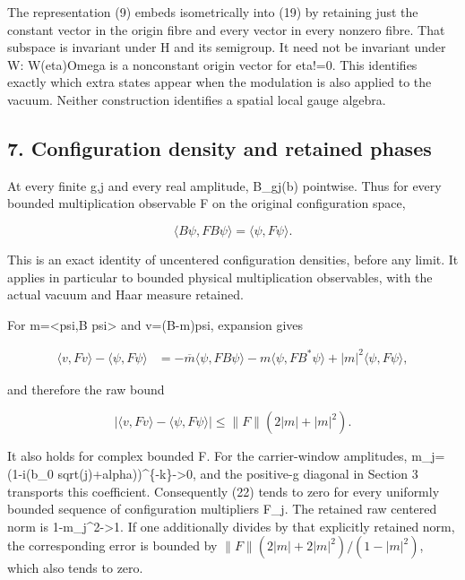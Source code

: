 \documentclass[
  11pt,
]{article}
\begin{document}
The representation (9) embeds isometrically into (19) by retaining just
the constant vector in the origin fibre and every vector in every
nonzero fibre. That subspace is invariant under H and its semigroup. It
need not be invariant under W: W(eta)Omega is a nonconstant origin
vector for eta!=0. This identifies exactly which extra states appear
when the modulation is also applied to the vacuum. Neither construction
identifies a spatial local gauge algebra.

\subsection{7. Configuration density and retained
phases}\label{weak-coupling-part-5-configuration-density-and-retained-phases}

At every finite g,j and every real amplitude,
\textbar B\_gj(b) pointwise. Thus for every bounded
multiplication observable F on the original configuration space,

\[
 \langle B\psi,F B\psi\rangle=\langle\psi,F\psi\rangle.
 \tag{21}
\]

This is an exact identity of uncentered configuration densities, before
any limit. It applies in particular to bounded physical multiplication
observables, with the actual vacuum and Haar measure retained.

For m=\textless psi,B psi\textgreater{} and v=(B-m)psi, expansion gives

\[
 \begin{split}
 \langle v,Fv\rangle-\langle\psi,F\psi\rangle
 &=-\overline m\langle\psi,FB\psi\rangle
   -m\langle\psi,FB^*\psi\rangle
   +|m|^2\langle\psi,F\psi\rangle,
 \end{split}
\]

and therefore the raw bound

\[
 \left|\langle v,Fv\rangle-\langle\psi,F\psi\rangle\right|
 \le\|F\|(2|m|+|m|^2).
 \tag{22}
\]

It also holds for complex bounded F. For the carrier-window amplitudes,
m\_j=(1-i(b\_0 sqrt(j)+alpha))\^{}\{-k\}-\textgreater0, and the
positive-g diagonal in Section 3 transports this coefficient.
Consequently (22) tends to zero for every uniformly bounded sequence of
configuration multipliers F\_j. The retained raw centered norm is
1-\textbar m\_j\textbar\^{}2-\textgreater1. If one additionally divides
by that explicitly retained norm, the corresponding error is bounded by
\(\|F\|(2|m|+2|m|^2)/(1-|m|^2)\), which also tends to zero.
\end{document}
